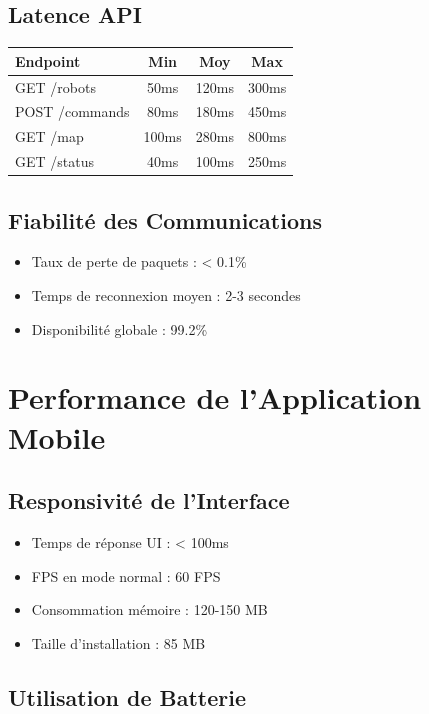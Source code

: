 \documentclass[12pt,a4paper,oneside]{report}
\begin{document}
\subsection{Latence API}

\begin{table}[H]
\centering
\begin{tabular}{|l|c|c|c|}
\hline
\textbf{Endpoint} & \textbf{Min} & \textbf{Moy} & \textbf{Max} \\
\hline
GET /robots & 50ms & 120ms & 300ms \\
POST /commands & 80ms & 180ms & 450ms \\
GET /map & 100ms & 280ms & 800ms \\
GET /status & 40ms & 100ms & 250ms \\
\hline
\end{tabular}
\end{table}

\subsection{Fiabilité des Communications}

\begin{itemize}
  \item Taux de perte de paquets : < 0.1\%
  \item Temps de reconnexion moyen : 2-3 secondes
  \item Disponibilité globale : 99.2\%
\end{itemize}

\section{Performance de l'Application Mobile}

\subsection{Responsivité de l'Interface}

\begin{itemize}
  \item Temps de réponse UI : < 100ms
  \item FPS en mode normal : 60 FPS
  \item Consommation mémoire : 120-150 MB
  \item Taille d'installation : 85 MB
\end{itemize}

\subsection{Utilisation de Batterie}
\end{document}

